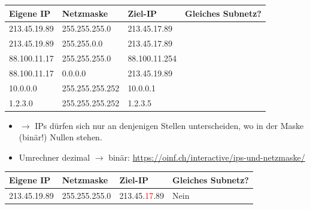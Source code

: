 \begin{myexercise}
	\begin{table}[H]
		\centering
		\begin{tabular}{l|l|l|m{2cm}}

			\textbf{Eigene \gls{IP}} & \textbf{Netzmaske} & \textbf{Ziel-\gls{IP}} & \textbf{Gleiches \newline Subnetz?} \\\midrule\midrule

			213.45.19.89             & 255.255.255.0      & 213.45.17.89           & \fldT                               \\\midrule

			213.45.19.89             & 255.255.0.0        & 213.45.17.89           & \fldT                               \\\midrule

			88.100.11.17             & 255.255.255.0      & 88.100.11.254          & \fldT                               \\\midrule

			88.100.11.17             & 0.0.0.0            & 213.45.19.89           & \fldT                               \\\midrule

			10.0.0.0                 & 255.255.255.252    & 10.0.0.1               & \fldT                               \\\midrule
			1.2.3.0                  & 255.255.255.252    & 1.2.3.5                & \fldT
		\end{tabular}
	\end{table}
	\begin{itemize}
		\item $\rightarrow$ \gls{IP}s dürfen sich nur an denjenigen Stellen unterscheiden, wo in der Maske (binär!) Nullen stehen.
		\item Umrechner dezimal $\rightarrow$ binär: \url{https://oinf.ch/interactive/ips-und-netzmaske/}
	\end{itemize}
	\begin{myanswer}

		\begin{table}[H]
			\centering
			\begin{tabular}{l|l|l|l}

				\textbf{Eigene IP} & \textbf{Netzmaske} & \textbf{Ziel-IP}                 & \textbf{Gleiches Subnetz?} \\\midrule\midrule

				213.45.19.89       & 255.255.255.0      & 213.45.\textcolor{red}{17}.89    & Nein                                \\\midrule


\end{tabular}
\end{table}
\end{myanswer}
\end{myexercise}
